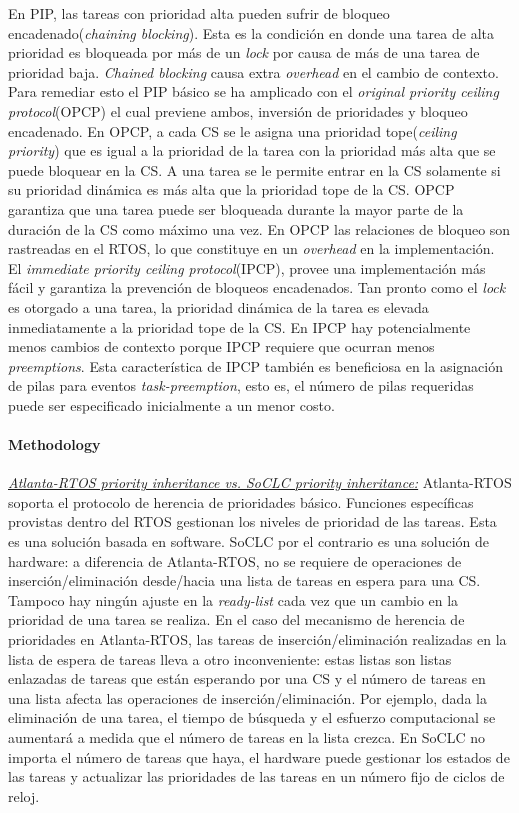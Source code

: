 En PIP, las tareas con prioridad alta pueden sufrir de bloqueo encadenado(\textit{chaining blocking}). Esta es la condición en donde una tarea de alta prioridad  es bloqueada por más de un \textit{lock} por causa de más de una tarea de prioridad baja. \textit{Chained blocking} causa extra \textit{overhead} en el cambio de contexto. Para remediar esto el PIP básico se ha amplicado con el \textit{original priority ceiling protocol}(OPCP) el cual previene ambos, inversión de prioridades y bloqueo encadenado. En OPCP, a cada CS se le asigna una prioridad tope(\textit{ceiling priority}) que es igual a la prioridad de la tarea con la prioridad más alta que se puede bloquear en la CS. A una tarea se le permite entrar en la CS solamente si su prioridad dinámica es más alta que la prioridad tope de la CS. OPCP garantiza que una tarea puede ser bloqueada durante la mayor parte de la duración de la CS como máximo una vez. En OPCP las relaciones de bloqueo son rastreadas en el RTOS, lo que constituye en un \textit{overhead} en la implementación. El \textit{immediate priority ceiling protocol}(IPCP), provee una implementación más fácil y garantiza la prevención de bloqueos encadenados. Tan pronto como el \textit{lock} es otorgado a una tarea, la prioridad dinámica de la tarea es elevada inmediatamente a la prioridad tope de la CS. En IPCP hay potencialmente menos cambios de contexto porque IPCP requiere que ocurran menos \textit{preemptions}. Esta característica de IPCP también es beneficiosa en la asignación de pilas para eventos \textit{task-preemption}, esto es, el número de pilas requeridas puede ser especificado inicialmente a un menor costo.

\paragraph{\textnormal{\textbf{Methodology}}} 
\underline{\textit{Atlanta-RTOS priority inheritance vs. SoCLC priority inheritance:}} Atlanta-RTOS soporta el protocolo de herencia de prioridades básico. Funciones específicas provistas dentro del RTOS gestionan los niveles de prioridad de las tareas. Esta es una solución basada en software. SoCLC por el contrario es una solución de hardware: a diferencia de Atlanta-RTOS, no se requiere de operaciones de inserción/eliminación desde/hacia una lista de tareas en espera para una CS. Tampoco hay ningún ajuste en la \textit{ready-list} cada vez que un cambio en la prioridad de una tarea se realiza. En el caso del mecanismo de herencia de prioridades en Atlanta-RTOS, las tareas de inserción/eliminación realizadas en la lista de espera de tareas lleva a otro inconveniente: estas listas son listas enlazadas de tareas que están esperando por una CS y el número de tareas en una lista afecta las operaciones de inserción/eliminación. Por ejemplo, dada la eliminación de una tarea, el tiempo de búsqueda y el esfuerzo computacional se aumentará a medida que el número de tareas en la lista crezca. En SoCLC no importa el número de tareas que haya, el hardware puede gestionar los estados de las tareas y actualizar las prioridades de las tareas en un número fijo de ciclos de reloj. 

